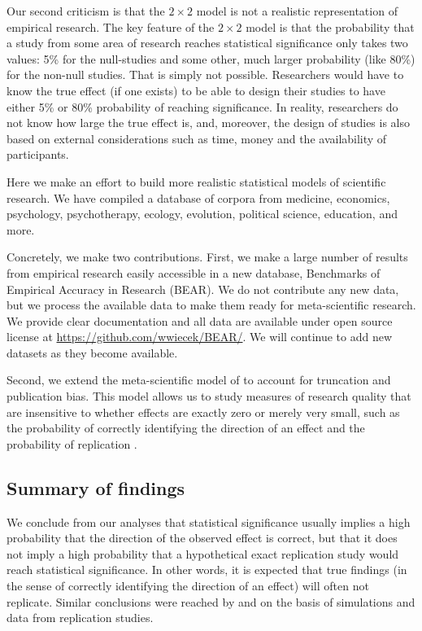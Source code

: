 \documentclass[11pt]{article}
\begin{document}
Our second criticism is that the $2 \times 2$ model is not a realistic representation of empirical research. The key feature of the $2 \times 2$ model is that the probability that a study from some area of research reaches statistical significance only takes two values: 5\% for the null-studies and some other, much larger probability (like 80\%) for the non-null studies. That is simply not possible. Researchers would have to know the true effect (if one exists) to be able to design their studies to have either 5\% or 80\% probability of reaching significance. In reality, researchers do not know how large the true effect is, and, moreover, the design of studies is also based on external considerations such as time, money and the availability of participants. 

Here we make an effort to build more realistic statistical models of scientific research. We have compiled a database of corpora from medicine, economics, psychology, psychotherapy, ecology, evolution, political science, education, and more.

Concretely, we make two contributions. First, we make a large number of results from empirical research easily accessible in a new database, Benchmarks of Empirical Accuracy in Research (BEAR). We do not contribute any new data, but we process the available data to make them ready for meta-scientific research. We provide clear documentation and all data are available under open source license at \url{https://github.com/wwiecek/BEAR/}. We will continue to add new datasets as they become available.

Second, we extend the meta-scientific model of \textcite{stephens2017false,van2021statistical,zwet2022proposal}  to account for truncation and publication bias. This model allows us to study measures of research quality that are insensitive to whether effects are exactly zero or merely very small, such as the probability of correctly identifying the direction of an effect and the probability of replication \parencite{greenland2017invited, gelman2014beyond, gelman2000type}. 

\subsection{Summary of findings}

We conclude from our analyses that statistical significance usually implies a high probability that the direction of the observed effect is correct, but that it does not imply a high probability that a hypothetical exact replication study would reach statistical significance. In other words, it is expected that true findings (in the sense of correctly identifying the direction of an effect) will often not replicate. Similar conclusions were reached by \textcite{bak2022revisiting} and \textcite{neves2022most} on the basis of simulations and data from replication studies.
\end{document}
